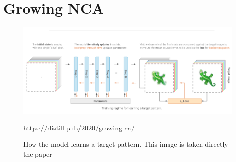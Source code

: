 \section{Growing NCA}
\begin{figure}[h]
	\includegraphics[width=1\textwidth]{../Figures/training_nca.png}
	\centering
	\caption[NCA-training]{How the model learns a target pattern. This image is taken directly the  paper \cite{growing_nca}} 
	\label{fig:appendix-nca}
	\url{https://distill.pub/2020/growing-ca/}
\end{figure}
%
%
